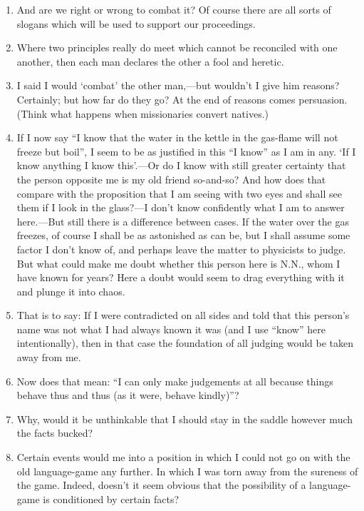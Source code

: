 \documentclass{book}
\begin{document}
\begin{enumerate}
\item
And are we right or wrong to combat it? Of course there are all sorts of
slogans which will be used to support our proceedings.

\item
Where two principles really do meet which cannot be reconciled with one
another, then each man declares the other a fool and heretic.

\item
I said I would `combat' the other man,---but wouldn't I give him reasons?
Certainly; but how far do they go? At the end of reasons comes persuasion.
(Think what happens when missionaries convert natives.)

\item
If I now say ``I know that the water in the kettle in the gas-flame will not
freeze but boil'', I seem to be as justified in this ``I know'' as I am in any.
`If I know anything I know this'.---Or do I know with still greater certainty
that the person opposite me is my old friend so-and-so? And how does that
compare with the proposition that I am seeing with two eyes and shall see them
if I look in the glass?---I don't know confidently what I am to answer
here.---But still there is a difference between cases. If the water over the
gas freezes, of course I shall be as astonished as can be, but I shall assume
some factor I don't know of, and perhaps leave the matter to physicists to
judge.  But what could make me doubt whether this person here is N.N., whom I
have known for years? Here a doubt would seem to drag everything with it and
plunge it into chaos.

\item
That is to say: If I were contradicted on all sides and told that this person's
name was not what I had always known it was (and I use ``know'' here
intentionally), then in that case the foundation of all judging would be taken
away from me.

\item
Now does that mean: ``I can only make judgements at all because things behave
thus and thus (as it were, behave kindly)''?

\item
Why, would it be unthinkable that I should stay in the saddle however much the
facts bucked?

\item
Certain events would me into a position in which I could not go on with the old
language-game any further. In which I was torn away from the sureness of the
game.  Indeed, doesn't it seem obvious that the possibility of a language-game
is conditioned by certain facts?


\end{enumerate}
\end{document}
